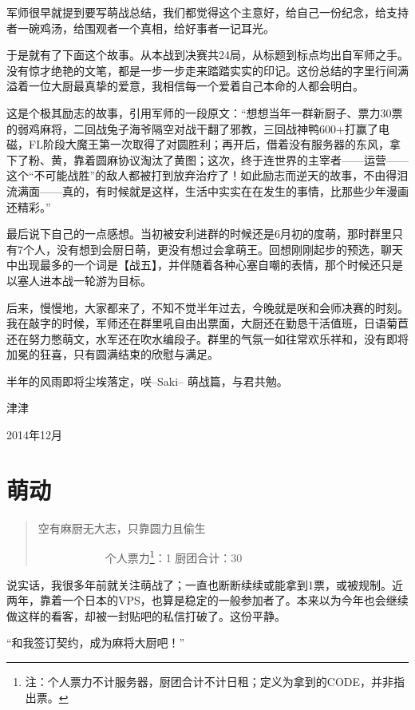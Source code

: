 军师很早就提到要写萌战总结，我们都觉得这个主意好，给自己一份纪念，给支持者一碗鸡汤，给围观者一个真相，给好事者一记耳光。

于是就有了下面这个故事。从本战到决赛共24局，从标题到标点均出自军师之手。没有惊才绝艳的文笔，都是一步一步走来踏踏实实的印记。这份总结的字里行间满溢着一位大厨最真挚的爱意，我相信每一个爱着自己本命的人都会明白。

这是个极其励志的故事，引用军师的一段原文：“想想当年一群新厨子、票力30票的弱鸡麻将，二回战兔子海爷隔空对战干翻了邪教，三回战神鸭600+打赢了电磁，FL阶段大魔王第一次取得了对圆胜利；再开后，借着没有服务器的东风，拿下了粉、黄，靠着圆麻协议淘汰了黄图；这次，终于连世界的主宰者——运营——这个“不可能战胜”的敌人都被打到放弃治疗了！如此励志而逆天的故事，不由得泪流满面——真的，有时候就是这样，生活中实实在在发生的事情，比那些少年漫画还精彩。”

最后说下自己的一点感想。当初被安利进群的时候还是6月初的度萌，那时群里只有7个人，没有想到会厨日萌，更没有想过会拿萌王。回想刚刚起步的预选，聊天中出现最多的一个词是【战五】，并伴随着各种心塞自嘲的表情，那个时候还只是以塞人进本战一轮游为目标。

后来，慢慢地，大家都来了，不知不觉半年过去，今晚就是咲和会师决赛的时刻。我在敲字的时候，军师还在群里吼自由出票面，大厨还在勤恳干活值班，日语菊苣还在努力憋萌文，水军还在吹水编段子。群里的气氛一如往常欢乐祥和，没有即将加冕的狂喜，只有圆满结束的欣慰与满足。

半年的风雨即将尘埃落定，咲–Saki– 萌战篇，与君共勉。

\begin{flushright}
\kai 津津

2014年12月
\end{flushright}

\chapter{萌动}

\begin{quote}
空有麻厨无大志，只靠圆力且偷生

　　　　　　个人票力\footnote{注：个人票力不计服务器，厨团合计不计日租；定义为拿到的CODE，并非指出票。}：1 厨团合计：30
\end{quote}

说实话，我很多年前就关注萌战了；一直也断断续续或能拿到1票，或被规制。近两年，靠着一个日本的VPS，也算是稳定的一般参加者了。本来以为今年也会继续做这样的看客，却被一封贴吧的私信打破了。这份平静。

 “和我签订契约，成为麻将大厨吧！”

